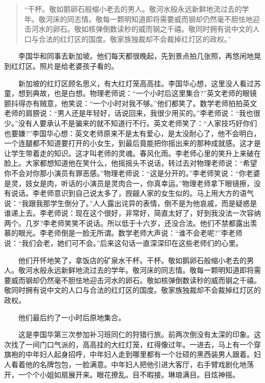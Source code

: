 \documentclass[12pt,UTF8]{ctexbook}
\begin{document}
\begin{quote}
\enquote{干杯。敬如鹅卵石般缩小老去的男人。敬河水般永远新鲜地流过去的学年。敬河床的同志情。敬每一颗明知道即将需要威而钢却仍然毫不胆怯地迎击河水的卵石。敬如核弹倒数读秒的威而钢之千禧。敬同时拥有说中文的人口与合法的红灯区的国度。敬家族独裁却不会裁掉红灯区的政权。}
\end{quote}

　　李国华和同事去新加坡。他们每天都很晚起，先到景点拍几张照，再悠闲地晃到红灯区。照片是给老婆孩子看的。

　　新加坡的红灯区顾名思义，有大红灯笼高高挂。李国华心想，这里没人看过苏童，想到典故，也是白想。物理老师说：\enquote{一个小时后这里集合?}英文老师的眼镜颤抖得亦有贼意，他笑说：\enquote{一个小时对我不够。}他们都笑了。数学老师拍拍英文老师的肩膀说：\enquote{男人还是年轻好，话说回来，我很少用买的。}李老师说：\enquote{我也很少。}没有人要承认不是骗来的就不知道行不行。英文老师笑了：\enquote{人家技巧好你们也要嫌?}李国华心想：英文老师原来不是太有爱心，是太没耐心了，他不会明白，一个连腿都不知道要打开的小女生，到最后竟能把你摇出来的那种成就感。这才是让学生带着走的知识。这才叫老师的灵魂。春风化雨。李老师心里的笑升上来破在脸上。大家都想知道他在笑什么，他摇摇头不说话，转过去对物理老师说：\enquote{希望你不会对你那小演员有罪恶感。}物理老师说：\enquote{这是分开的。}李老师笑说：\enquote{你老婆是灵，妓女是肉，听话的小演员是灵肉合一，你真幸运。}物理老师拿下眼镜擦，没有说话。李老师意识到自己说太多了，觊觎人家的女生似的。马上用大方的语气说：\enquote{我跟我那学生倒分了。}人人露出诧异的表情，倒不是为他哀戚，而是疑惑是谁递上去。李老师说：现在这个很好，非常好，简直太好了，好到我没法一次容纳两个。几岁?李老师笑笑不说话。所以低于十六岁，还没合法。他们不禁都露出羡慕的眼光。李老师倒是一脸无所谓。数学老师大声说：\enquote{谁不会老呢?}李老师说：\enquote{我们会老，她们可不会。}后来这句话一直深深印在这些老师们的心里。

　　他们开怀地笑了，拿饭店的矿泉水干杯。干杯。敬如鹅卵石般缩小老去的男人。敬河水般永远新鲜地流过去的学年。敬河床的同志情。敬每一颗明知道即将需要威而钢却仍然毫不胆怯地迎击河水的卵石。敬如核弹倒数读秒的威而钢之千禧。敬同时拥有说中文的人口与合法的红灯区的国度。敬家族独裁却不会裁掉红灯区的政权。

　　他们最后约了一小时后原地集合。

　　这是李国华第三次参加补习班同仁的狩猎行旅。前两次倒没有太深的印象。这次找了一间门口气派的，高高挂的大红灯笼，红得像过年。一进去，马上有一个穿旗袍的中年妇人起身招呼，中年妇人走到哪里都有一个壮硕的黑西装男人跟着。妇人看着他的名牌包包，一脸满意。中年妇人把他引进大客厅，右手臂戏剧化地荡开，一个个小姐如扇展开来。眼花撩乱。目不暇接。琳琅满目。目炫神摇。
\end{document}
